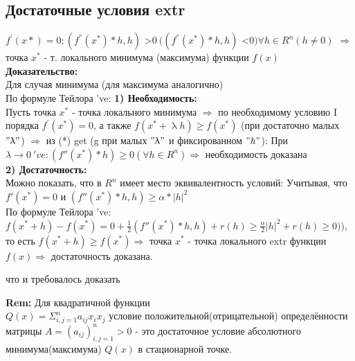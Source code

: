\subsection*{Достаточные условия extr} $f^{'}(x*)=0; (f^{''}(x^*)*h, h)$ \textgreater $0 \ ((f^{''}(x^*)*h, h)$ \textless $0) \forall h \in R^n (h \neq 0)$ $\Rightarrow $ точка $x^*$ - т. локального минимума (максимума) функции $f(x)$\\
\textbf{Доказательство:} \\
Для случая минимума (для максимума аналогично) \\
По формуле Тейлора 've:
\textbf{1) Необходимость:} \\
Пусть точка $x^*$ - точка локального минимума $\Rightarrow$ по необходимому условию I порядка $f^{'}(x^*)=0$, а также $f(x^* + \uplambda h) \geq f(x^*)$ (при достаточно малых $"\uplambda"$) $\Rightarrow$ из (*) get (g при малых $"\uplambda"$ и фиксированном $"h"$):
При $\lambda \rightarrow 0 \ 've: (f''(x^*)*h)\geq 0 (\forall h \in R^n) \Rightarrow $ необходимость доказана \\
\textbf{2) Достаточность:}\\
Можно показать, что в $R^n$ имеет место эквивалентность условий:
Учитывая, что $f'(x^*)=0$ и $(f''(x^*)*h,h)\geq \alpha * |h|^2$ \\
По формуле Тейлора 've:\\
$f(x^*+h)-f(x^*)=0+\frac{1}{2}(f''(x^*)*h,h)+r(h)\geq \frac{\alpha}{2}|h|^2+r(h) \geq 0))$, то есть $f(x^*+h) \geq f(x^*) \Rightarrow$ точка $x^*$ - точка локального extr функции $f(x) \Rightarrow$ достаточность доказана.
\begin{center}
что и требовалось доказать
\end{center}
\textbf{Rem:} 
Для квадратичной функции\\
$Q(x)=\Sigma^n_{i,j=1} a_{ij}x_i x_j$ условие положительной(отрицательной) определённости матрицы $A=(a_{ij})^n_{i,j=1}>0$ - это достаточное условие абсолютного минимума(максимума) $Q(x)$ в стационарной точке.

